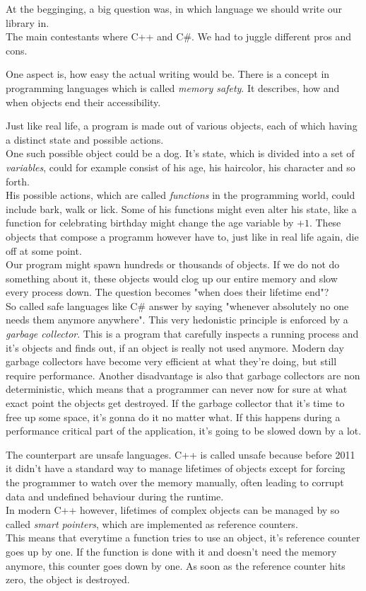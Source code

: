 At the begginging, a big question was, in which language we should write our library in.\\
The main contestants where C++ and C\#.
We had to juggle different pros and cons.

One aspect is, how easy the actual writing would be.  
There is a concept in programming languages which is called \emph{memory safety}. 
It describes, how and when objects end their accessibility.

Just like real life, a program is made out of various objects, each of which having a distinct state and possible actions.\\
One such possible object could be a dog. It's state, which is divided into a set of \emph{variables}, could for example consist of his age, his haircolor, his character and so forth. \\
His possible actions, which are called \emph{functions} in the programming world, could include bark, walk or lick. Some of his functions might even alter his state, like a function for celebrating birthday might change the age variable by $+1$. These objects that compose a programm however have to, just like in real life again, die off at some point.\\
Our program might spawn hundreds or thousands of objects. If we do not do something about it, these objects would clog up our entire memory and slow every process down. The question becomes "when does their lifetime end"?\\
So called safe languages like C\# answer by saying "whenever absolutely no one needs them anymore anywhere". This very hedonistic principle is enforced by a \emph{garbage collector}. This is a program that carefully inspects a running process and it's objects and finds out, if an object is really not used anymore. Modern day garbage collectors have become very efficient at what they're doing, but still require performance. Another disadvantage is also that garbage collectors are non deterministic, which means that a programmer can never now for sure at what exact point the objects get destroyed. If the garbage collector that it's time to free up some space, it's gonna do it no matter what. If this happens during a performance critical part of the application, it's going to be slowed down by a lot.
 
The counterpart are unsafe languages. C++ is called unsafe because before 2011 it didn't have a standard way to manage lifetimes of objects except for forcing the programmer to watch over the memory manually, often leading to corrupt data and undefined behaviour during the runtime. \cite{Stroustrup2013}\\
In modern C++ however, lifetimes of complex objects can be managed by so called \emph{smart pointers}, which are implemented as reference counters.\\
This means that everytime a function tries to use an object, it's reference counter goes up by one. If the function is done with it and doesn't need the memory anymore, this counter goes down by one. As soon as the reference counter hits zero, the object is destroyed. 
 
